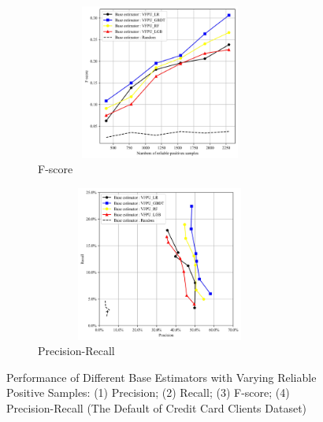 \documentclass[10pt,journal,compsoc]{IEEEtran}
\begin{document}
\begin{figure}[!htbp]
	\begin{subfigure}{0.45\textwidth}
		\centering
		\captionsetup{skip=4pt}
		\captionsetup{size=scriptsize}
		\includegraphics[width=0.9\textwidth,height=5.1cm]{./Figure 3 (3) in JEPG format}
		\caption{F-score}
		\label{RQ2.2.sub3}
	\end{subfigure}
	\begin{subfigure}{0.45\textwidth}
		\centering
		\captionsetup{skip=4pt}
		\captionsetup{size=scriptsize}
		\includegraphics[width=0.9\textwidth,height=5.1cm]{./Figure 3 (4) in JEPG format}
		\caption{Precision-Recall}
		\label{RQ2.2.sub4}
	\end{subfigure}
	
	\caption{Performance of Different Base Estimators with Varying Reliable Positive Samples: (1) Precision; (2) Recall; (3) F-score; (4) Precision-Recall (The Default of Credit Card Clients Dataset)}
	\label{RQ2.2}
\end{figure}
\end{document}
